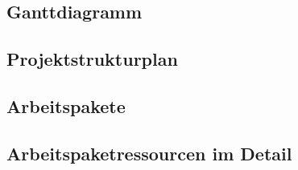 \documentclass[12pt,toc=sectionentrywithoutdots, headheight=44pt, headings=optiontoheadandtoc]{scrartcl}
\begin{document}
\subsection{Ganttdiagramm}
\blindtext

\subsection{Projektstrukturplan}
\blindtext

\subsection{Arbeitspakete}
\blindtext

\subsection{Arbeitspaketressourcen im Detail}
\blindtext
\end{document}

